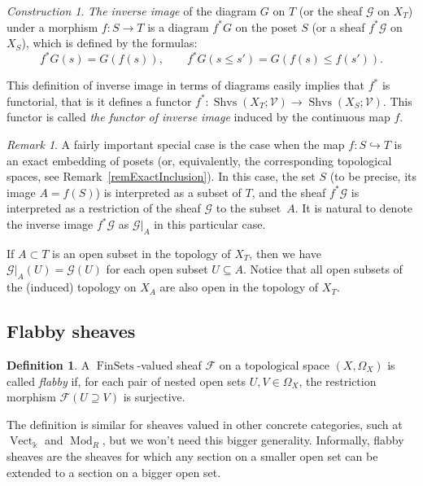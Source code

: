 \documentclass[english,12pt,oneside]{amsproc}
\DeclareMathOperator{\Vect}{Vect}
\DeclareMathOperator{\Mod}{Mod}
\DeclareMathOperator{\FinSets}{FinSets}
\DeclareMathOperator{\Shvs}{Shvs}
\newcommand{\ko}{\Bbbk}
\newcommand{\ca}[1]{\mathcal{#1}}
\newcommand{\Vv}{\mathcal{V}}
\newcounter{stmcounter}[section]
\numberwithin{equation}{section}
\theoremstyle{plain}
\theoremstyle{definition}
\newtheorem{defin}[stmcounter]{Definition}
\theoremstyle{remark}
\newtheorem{rem}[stmcounter]{Remark}
\newtheorem{con}[stmcounter]{Construction}
\begin{document}
\begin{con}\label{conInverseImage}
\emph{The inverse image} of the diagram $G$ on $T$ (or the sheaf $\ca{G}$ on $X_T$) under a morphism $f\colon S\to T$ is
a diagram $f^*G$ on the poset $S$ (or a sheaf $f^*\ca{G}$ on $X_S$), which is defined by the formulas:
\[
f^*G(s)=G(f(s)),\qquad f^*G(s\leqslant s')=G(f(s)\leqslant f(s')).
\]
\end{con}

This definition of inverse image in terms of diagrams easily implies that $f^*$ is functorial, that is it defines a functor $f^*\colon\Shvs(X_T;\Vv)\to \Shvs(X_S;\Vv)$. This functor is called \emph{the functor of inverse image} induced by the continuous map $f$.

\begin{rem}\label{remRestrictionOfSheaf}
A fairly important special case is the case when the map $f\colon S\hookrightarrow T$ is an exact embedding of posets (or, equivalently, the corresponding topological spaces, see Remark~\ref{remExactInclusion}). In this case, the set $S$ (to be precise, its image $A=f(S)$) is interpreted as a subset of $T$, and the sheaf $f^*\ca{G}$ is interpreted as a restriction of the sheaf $\ca{G}$ to the subset~$A$. It is natural to denote the inverse image $f^*\ca{G}$ as $\ca{G}|_A$ in this particular case.

If $A\subset T$ is an open subset in the topology of $X_T$, then we have $\ca{G}|_A(U)=\ca{G}(U)$ for each open subset $U\subseteq A$.
Notice that all open subsets of the (induced) topology on $X_A$ are also open in the topology of $X_T$.
\end{rem}

\subsection{Flabby sheaves}

\begin{defin}\label{defFlabby}
A $\FinSets$-valued sheaf $\ca{F}$ on a topological space $(X,\Omega_X)$ is called \emph{flabby} if, for each pair of nested open sets $U,V\in\Omega_X$, the restriction morphism $\ca{F}(U\supseteq V)$ is surjective.
\end{defin}

The definition is similar for sheaves valued in other concrete categories, such at $\Vect_\ko$ and $\Mod_R$, but we won't need this bigger generality. Informally, flabby sheaves are the sheaves for which any section on a smaller open set can be extended to a section on a bigger open set.
\end{document}
